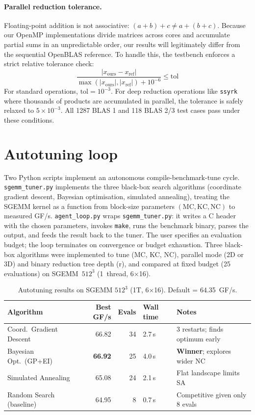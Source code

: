 \documentclass[11pt,a4paper]{article}
\begin{document}
\paragraph{Parallel reduction tolerance.}
Floating-point addition is not associative: $(a+b)+c \neq a+(b+c)$. Because our OpenMP implementations divide matrices across cores and accumulate partial sums in an unpredictable order, our results will legitimately differ from the sequential OpenBLAS reference.
To handle this, the testbench enforces a strict relative tolerance check:
$$ \frac{|x_{\text{ours}} - x_{\text{ref}}|}{\max(|x_{\text{ours}}|, |x_{\text{ref}}|) + 10^{-6}} \le \text{tol} $$
For standard operations, $\text{tol} = 10^{-3}$. For deep reduction operations like \texttt{ssyrk} where thousands of products are accumulated in parallel, the tolerance is safely relaxed to $5\times10^{-3}$. All 1287 BLAS 1 and 118 BLAS 2/3 test cases pass under these conditions.

\section{Autotuning loop}
Two Python scripts implement an autonomous compile-benchmark-tune cycle.
\texttt{sgemm\_tuner.py} implements the three black-box search algorithms (coordinate gradient descent, Bayesian optimisation, simulated
annealing), treating the SGEMM kernel as a function from block-size
parameters $(\text{MC}, \text{KC}, \text{NC})$ to measured GF/s.
\texttt{agent\_loop.py} wraps \texttt{sgemm\_tuner.py}: it writes a C header
with the chosen parameters, invokes \texttt{make}, runs the benchmark binary,
parses the output, and feeds the result back to the tuner.
The user specifies an evaluation budget; the loop terminates on convergence or budget exhaustion.
Three black-box algorithms were implemented to tune (MC, KC, NC), parallel mode (2D or 3D) and binary reduction tree depth (r), and compared
at fixed budget (25 evaluations) on SGEMM~$512^3$ (1~thread, 6$\times$16).

\begin{table}[h]
\centering
\caption{Autotuning results on SGEMM $512^3$ (1T, 6$\times$16). Default = 64.35~GF/s.}
\label{tab:autotune}
\small
\begin{tabular}{lrrlp{4.5cm}}
\toprule
Algorithm & Best GF/s & Evals & Wall time & Notes\\
\midrule
Coord.\ Gradient Descent & 66.82 & 34 & 2.7\,s& 3 restarts; finds optimum early\\
Bayesian Opt.\ (GP+EI)   & \textbf{66.92} & 25 & 4.0\,s & \textbf{Winner}; explores wider NC\\
Simulated Annealing      & 65.08 & 24 & 2.1\,s & Flat landscape limits SA\\
Random Search (baseline) & 64.95 &  8 & 0.7\,s & Competitive given only 8 evals\\
\bottomrule
\end{tabular}
\end{table}
\end{document}
